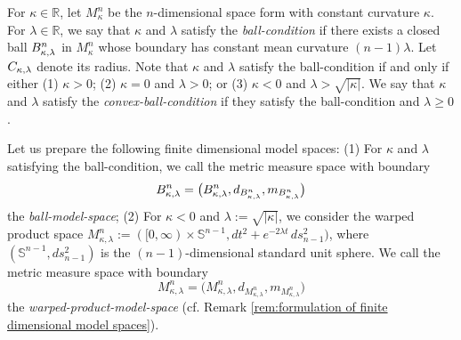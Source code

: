 For $\kappa \in \mathbb{R}$,
let $M^{n}_{\kappa}$ be the $n$-dimensional space form with constant curvature $\kappa$.
For $\lambda \in \mathbb{R}$,
we say that $\kappa$ and $\lambda$ satisfy the \textit{ball-condition}
if there exists a closed ball $B^{n}_{\kappa,\lambda}$ in $M^{n}_{\kappa}$ whose boundary has constant mean curvature $(n-1)\lambda$.
Let $C_{\kappa,\lambda}$ denote its radius.
Note that $\kappa$ and $\lambda$ satisfy the ball-condition if and only if either
(1) $\kappa>0$; 
(2) $\kappa=0$ and $\lambda>0$;
or (3) $\kappa<0$ and $\lambda>\sqrt{\vert \kappa \vert}$.
We say that $\kappa$ and $\lambda$ satisfy the \textit{convex-ball-condition}
if they satisfy the ball-condition and $\lambda \geq 0$.

Let us prepare the following finite dimensional model spaces: 
(1) For $\kappa$ and $\lambda$ satisfying the ball-condition,
we call the metric measure space with boundary
\begin{equation}\label{eq:ball model}
B^{n}_{\kappa,\lambda}=\bigl(B^{n}_{\kappa,\lambda},d_{B^{n}_{\kappa,\lambda}},m_{B^{n}_{\kappa,\lambda}} \bigl)
\end{equation}
the \textit{ball-model-space};
(2) For $\kappa<0$ and $\lambda:=\sqrt{\vert \kappa \vert}$,
we consider the warped product space $M^{n}_{\kappa,\lambda}:=([0,\infty) \times \mathbb{S}^{n-1},dt^{2}+e^{-2\lambda t}\,ds_{n-1}^{2})$,
where $(\mathbb{S}^{n-1},ds_{n-1}^{2})$ is the $(n-1)$-dimensional standard unit sphere.
We call the metric measure space with boundary
\begin{equation}\label{eq:warped product model}
M^{n}_{\kappa,\lambda}=\bigl(M^{n}_{\kappa,\lambda},d_{M^{n}_{\kappa,\lambda}},m_{M^{n}_{\kappa,\lambda}}\bigl)
\end{equation}
the \textit{warped-product-model-space} (cf. Remark \ref{rem:formulation of finite dimensional model spaces}).

